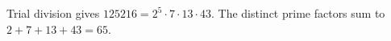 Trial division gives $125216=2^5\cdot7\cdot13\cdot43$. The distinct prime factors sum to $2+7+13+43=\boxed{65}$.

